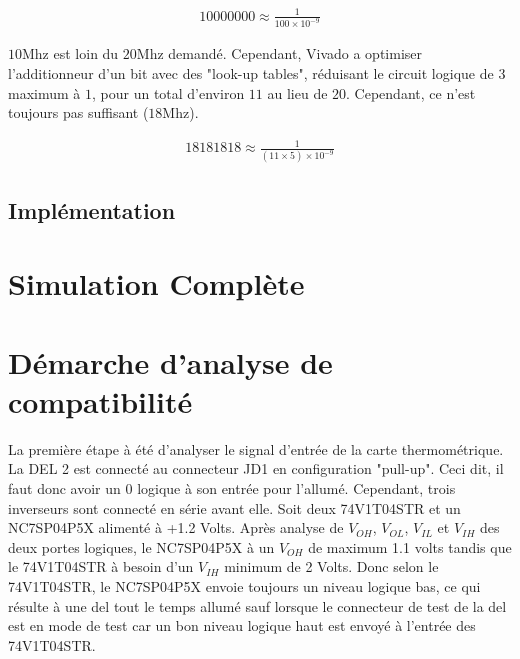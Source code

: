 \documentclass[a11paper]{article}
\begin{document}
\begin{align}
  10000000 \approx \frac{1}{100\times10^{-9}}
\end{align}

$10\text{Mhz}$ est loin du $20\text{Mhz}$ demandé. Cependant, Vivado a optimiser l'additionneur d'un bit avec des "look-up tables",
réduisant le circuit logique de $3$ maximum à $1$, pour un total d'environ $11$ au lieu de $20$. Cependant, ce n'est toujours pas
suffisant ($18\text{Mhz}$).

\begin{align}
  18181818 \approx \frac{1}{(11\times5)\times10^{-9}}
\end{align}

\subsection{Implémentation}

\section{Simulation Complète}

\section{Démarche d'analyse de compatibilité}
La première étape à été d'analyser le signal d'entrée de la carte thermométrique. La DEL 2 est connecté au connecteur JD1 en
configuration "pull-up". Ceci dit, il faut donc avoir un 0 logique à son entrée pour l'allumé. Cependant, trois inverseurs sont
connecté en série avant elle. Soit deux 74V1T04STR et un NC7SP04P5X alimenté à +1.2 Volts. Après analyse de $V_{OH}$, $V_{OL}$, $V_{IL}$
et $V_{IH}$ des deux portes logiques, le NC7SP04P5X à un $V_{OH}$ de maximum 1.1 volts tandis que le 74V1T04STR à besoin d'un $V_{IH}$
minimum de 2 Volts. Donc selon le 74V1T04STR, le NC7SP04P5X envoie toujours un niveau logique bas, ce qui résulte à une del
tout le temps allumé sauf lorsque le connecteur de test de la del est en mode de test car un bon niveau logique haut est envoyé à
l'entrée des 74V1T04STR.


\end{document}
